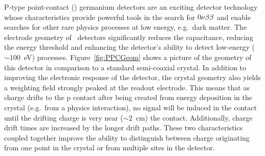   P-type point-contact (\ppc) germanium detectors are an exciting detector
technology whose characteristics provide powerful tools in the search for
$0 \nu \beta \beta$ and enable searches for other rare physics processes at low energy, e.g.~dark matter.  
The electrode geometry of \ppc~detectors significantly reduces the
capacitance, reducing the energy threshold and enhancing the detector's
ability to detect low-energy ($\sim100$~eV) processes.  Figure~\ref{fig:PPCGeom} shows a picture of the geometry of this detector in comparison to a standard semi-coaxial crystal.  In addition to improving the electronic response of the detector, the crystal geometry also yields a weighting field strongly peaked at the readout electrode.  This means that as charge drifts to the p contact after being created from energy deposition in the crystal (e.g.~from a physics interaction), no signal will be induced in the contact until the drifting charge is very near ($\sim2$~cm) the contact.  Additionally, charge drift times are increased by the longer drift paths.  These two characteristics coupled together improve the ability to distinguish between charge originating from one point in the crystal or from multiple sites in the detector.

